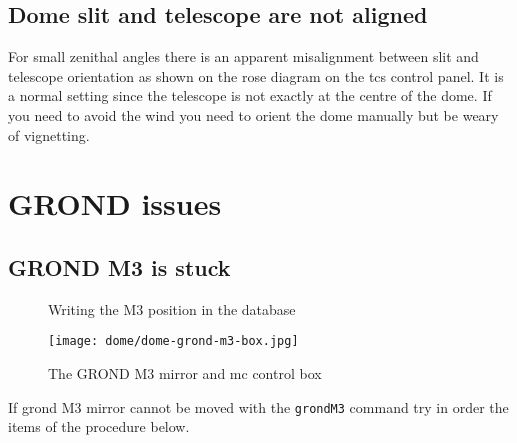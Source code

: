 \documentclass[11pt,fleqn,a4paper]{book}
\begin{document}
\subsection{Dome slit and telescope are not aligned}
For small zenithal angles there is an apparent misalignment between \gls{slit} and telescope orientation as shown on the \gls{rose diagram} on the \gls{tcs} control panel. It is a normal setting since the telescope is not exactly at the centre of the \gls{dome}.  If you need to avoid the wind you need to orient the \gls{dome} manually but be weary of vignetting.

\section{GROND issues}
\subsection{GROND M3 is stuck}
\begin{figure}[t!]
\begin{minipage}{0.28\linewidth}
\end{minipage}
\hspace{0.02\linewidth}
\begin{minipage}{0.7\linewidth}
\end{minipage}
\caption[Writing the GROND M3 position to the database]{Writing the \gls{M3} position in the database}
\label{fig:ccs-grondM3}
\end{figure}

\begin{figure}
\texttt{[image: dome/dome-grond-m3-box.jpg]}
\caption[GROND M3 mirror and MC control box]{The GROND \gls{M3} mirror and \gls{mc} control box}
\label{fig:grondM3-box}
\end{figure}

If \gls{grond} \gls{M3} mirror cannot be moved with the \texttt{\gls{grondM3}} command try in order the items of the procedure below.
\end{document}
